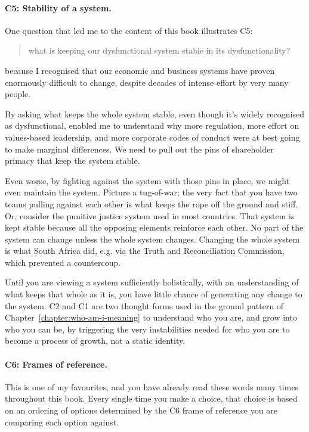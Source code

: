 \paragraph{\textbf{C5: Stability of a system.}}
One question that led me to the content of this book illustrates C5: 
\begin{quote} 
what is keeping our dysfunctional system stable in its dysfunctionality? 
\end{quote} 
because I recognised that our economic and business systems have proven enormously difficult to change, despite decades of intense effort by very many people. 


By asking what keeps the whole system stable, even though it's widely recognised as dysfunctional, enabled me to understand why more regulation, more effort on values-based leadership, and more corporate codes of conduct were at best going to make marginal differences. We need to pull out the pins of shareholder primacy that keep the system stable.


Even worse, by fighting against the system with those pins in place, we might even maintain the system. Picture a tug-of-war; the very fact that you have two teams pulling against each other is what keeps the rope off the ground and stiff. Or, consider the punitive justice system used in most countries. That system is kept stable because all the opposing elements reinforce each other. No part of the system can change unless the whole system changes. Changing the whole system is what South Africa did, e.g. via the Truth and Reconciliation Commission, which prevented a countercoup.


Until you are viewing a system sufficiently holistically, with an understanding of what keeps that whole as it is, you have little chance of generating any change to the system. C2 and C1 are two thought forms used in the ground pattern of Chapter~\ref{chapter:who-am-i-meaning} to understand who you are, and grow into who you can be, by triggering the very instabilities needed for who you are to become a process of growth, not a static identity.


\paragraph{\textbf{C6: Frames of reference.}}
This is one of my favourites, and you have already read these words many times throughout this book. Every single time you make a choice, that choice is based on an ordering of options determined by the C6 frame of reference you are comparing each option against.


